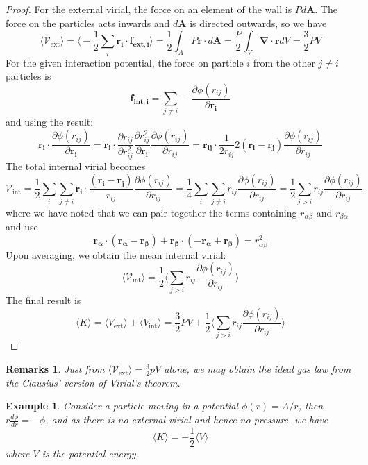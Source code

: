 \documentclass[a4paper]{article}
\newtheorem{eg}{Example}[section]
\newtheorem{remarks}{Remarks}[section]
\theoremstyle{new}
\begin{document}
\begin{proof}
For the external virial, the force on an element of the wall is $Pd\mathbf{A}$. The force on the particles acts inwards and $d\mathbf{A}$ is directed outwards, so we have
$$\langle\mathcal{V}_{\text{ext}}\rangle=\bigg\langle-\frac{1}{2}\sum_i\mathbf{r_i}\cdot\mathbf{f_{\text{ext},i}}\bigg\rangle=\frac{1}{2}\int_AP\mathbf{r}\cdot d\mathbf{A}=\frac{P}{2}\int_V\boldsymbol{\nabla}\cdot\mathbf{r}dV=\frac{3}{2}PV$$
For the given interaction potential, the force on particle $i$ from the other $j\neq i$ particles is
$$\mathbf{f_{\text{int},i}}=\sum_{j\neq i}-\frac{\partial\phi(r_{ij})}{\partial\mathbf{r_i}}$$
and using the result:
$$\mathbf{r_i}\cdot\frac{\partial\phi(r_{ij})}{\partial\mathbf{r_i}}=\mathbf{r_i}\cdot\frac{\partial r_{ij}}{\partial r_{ij}^2}\frac{\partial r_{ij}^2}{\partial\mathbf{r_i}}\frac{\partial\phi(r_{ij})}{\partial r_{ij}}=\mathbf{r_{ij}}\cdot\frac{1}{2r_{ij}}2(\mathbf{r_i}-\mathbf{r_j})\frac{\partial\phi(r_{ij})}{\partial r_{ij}}$$
The total internal virial becomes
$$\mathcal{V}_{\text{int}}=\frac{1}{2}\sum_i\sum_{j\neq i}\mathbf{r_i}\cdot\frac{(\mathbf{r_i}-\mathbf{r_j})}{r_{ij}}\frac{\partial\phi(r_{ij})}{\partial r_{ij}}=\frac{1}{4}\sum_i\sum_{j\neq i}r_{ij}\frac{\partial\phi(r_{ij})}{\partial r_{ij}}=\frac{1}{2}\sum_{j>i}r_{ij}\frac{\partial\phi(r_{ij})}{\partial r_{ij}}$$
where we have noted that we can pair together the terms containing $r_{\alpha\beta}$ and $r_{\beta\alpha}$ and use
$$\mathbf{r_\alpha}\cdot(\mathbf{r_\alpha}-\mathbf{r_\beta})+\mathbf{r_\beta}\cdot(-\mathbf{r_\alpha}+\mathbf{r_\beta})=r_{\alpha\beta}^2$$
Upon averaging, we obtain the mean internal virial:
$$\langle\mathcal{V}_{\text{int}}\rangle=\frac{1}{2}\bigg\langle\sum_{j>i}r_{ij}\frac{\partial\phi(r_{ij})}{\partial r_{ij}}\bigg\rangle$$
The final result is
$$\langle K\rangle=\langle V_{\text{ext}}\rangle+\langle V_{\text{int}}\rangle=\frac{3}{2}PV+\frac{1}{2}\bigg\langle\sum_{j>i}r_{ij}\frac{\partial\phi(r_{ij})}{\partial r_{ij}}\bigg\rangle$$
\end{proof}
\begin{remarks}
Just from $\langle\mathcal{V}_{\text{ext}}\rangle=\frac{3}{2}pV$ alone, we may obtain the ideal gas law from the Clausius' version of Virial's theorem.
\end{remarks}
\begin{eg}
Consider a particle moving in a potential $\phi(r)=A/r$, then $r\frac{d\phi}{dr}=-\phi$, and as there is no external virial and hence no pressure, we have
$$\langle K\rangle=-\frac{1}{2}\langle V\rangle$$
where $V$ is the potential energy.
\end{eg}
\end{document}
